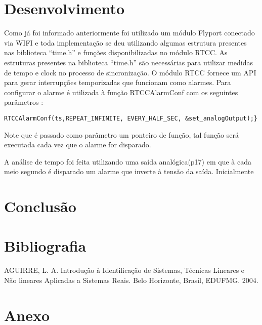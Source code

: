 \documentclass[a4paper, 12pt]{article}
\begin{document}
\section{Desenvolvimento}
Como já foi informado anteriormente foi utilizado um módulo Flyport conectado via WIFI e toda implementação se deu utilizando algumas estrutura presentes nas biblioteca “time.h”  e funções disponibilizadas no módulo RTCC.
	As estruturas presentes na biblioteca “time.h” são necessárias para utilizar medidas de tempo e clock no processo de sincronização. O módulo RTCC  fornece um API para gerar interrupções temporizadas que funcionam como alarmes. Para configurar o alarme é utilizada à função RTCCAlarmConf com os seguintes parâmetros :
\begin{lstlisting}
RTCCAlarmConf(ts,REPEAT_INFINITE, EVERY_HALF_SEC, &set_analogOutput);}
\end{lstlisting}

	Note que é passado como parâmetro um ponteiro de função, tal função será executada cada vez que o alarme for disparado.
	

A análise de tempo foi feita utilizando uma saída analógica(p17) em que à cada meio segundo é disparado um alarme que inverte à tensão da saída. Inicialmente 


\newpage

\section{Conclusão}

\newpage

\section*{Bibliografia}
\footnotesize{

\noindent AGUIRRE, L. A. Introdução à Identificação de Sistemas, Técnicas Lineares e Não lineares Aplicadas a Sistemas Reais. Belo Horizonte, Brasil, EDUFMG. 2004.\\

}
\newpage
{}
\section*{Anexo}
\end{document}
